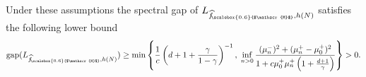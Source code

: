 \documentclass[11pt]{amsart}
\newcommand{\1}{\mathbbm{1}}
\newcommand{\hatfM}{\widehat{f}_{\!\scalebox{0.6}{$\mathscr{M}$}}
}
\theoremstyle{plain}
\theoremstyle{definition}
\theoremstyle{remark}
\numberwithin{equation}{section}
\begin{document}
 Under these assumptions the spectral gap of $L_{\hatfM,h(N)}$ satisfies the following lower bound
\begin{equation}
\label{eq:LowerBoundGapBirthDeath}
\mathrm{gap}(L_{\hatfM,h(N)}) \ge 
\min \left\{\frac{1}{c} 
\left( d + 1 + \frac{\gamma}{1 - \gamma} \right)
^{-1},
\;
\inf_{n > 0} 
\frac{(\mu^-_n)^2 + (\mu^+_n - \mu^+_0)^2}
{1 + c \mu^+_0 \mu^+_n \left( 1 + \frac{d + 1}{\gamma} \right)}
\right\}>0.
\end{equation}

\end{document}
